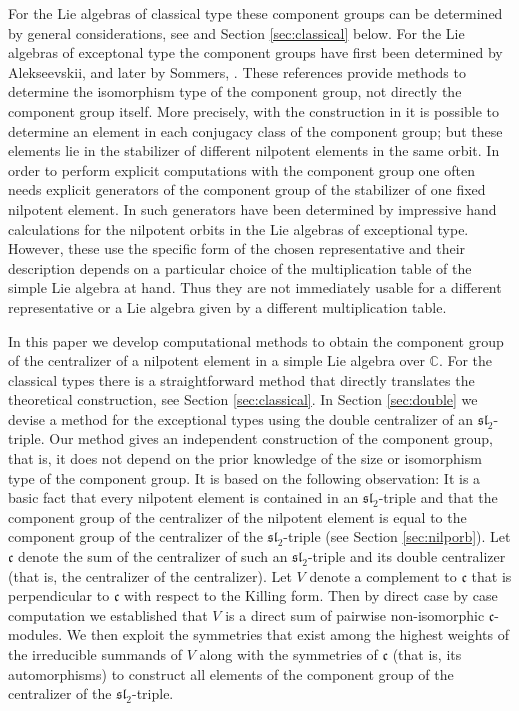 \documentclass[a4paper,10pt]{amsart}
\newcommand{\C}{\mathbb{C}}
\newcommand{\mf}{\mathfrak}
\newcommand{\ssl}{\mf{sl}}
\renewcommand{\c}{\mf{c}}
\numberwithin{equation}{section}
\theoremstyle{remark}
\theoremstyle{remark}
\begin{document}
For the Lie algebras of classical
type these component groups can be determined by general considerations,
see \cite[\S 3]{jannilp} and Section \ref{sec:classical} below.
For the Lie algebras of exceptonal type the component groups have first been
determined by Alekseevskii, \cite{alekseevski} and later by Sommers,
\cite{sommers}. These references provide methods to determine the
isomorphism type of the component group, not directly the component group
itself. More precisely, with
the construction in \cite{sommers} it is possible to determine
an element in each conjugacy class of the component group; but these elements
lie in the stabilizer of different nilpotent elements in the same orbit.
In order to perform explicit computations with the component group one
often needs explicit generators of the component group of the stabilizer of
one fixed nilpotent element. In \cite{lawtest} such generators have been
determined by impressive hand calculations for the nilpotent orbits in the
Lie algebras of exceptional type. However, these use the specific form
of the chosen representative and their description depends on a particular
choice of the multiplication table of the simple Lie algebra at hand. Thus
they are not immediately usable for a different representative
or a Lie algebra given by a different multiplication table.

In this paper we develop computational methods to obtain the component group
of the centralizer of a nilpotent element in a simple Lie algebra
over $\C$. For the classical types there is a straightforward method that
directly translates the theoretical construction, see Section
\ref{sec:classical}. In Section \ref{sec:double} we devise a method for the
exceptional types using the double centralizer of an $\ssl_2$-triple. 
Our method gives an independent construction of the component
group, that is, it does not depend on the prior knowledge of the size
or isomorphism type of the component group. It is based on the following
observation: It is a basic fact that every nilpotent element is contained
in an $\ssl_2$-triple and that the component group of the centralizer of the
nilpotent element is equal to the component group of the centralizer of the
$\ssl_2$-triple (see Section \ref{sec:nilporb}). Let $\c$ denote the sum of
the centralizer of such an $\ssl_2$-triple and its double centralizer (that is,
the centralizer of the centralizer). Let $V$ denote a complement to $\c$
that is perpendicular to $\c$ with respect to the Killing form. Then by
direct case by case computation we established that $V$ is a direct sum
of pairwise non-isomorphic $\c$-modules. We then exploit the symmetries that
exist among the highest weights of the irreducible summands of $V$ along with
the symmetries of $\c$ (that is, its automorphisms) to construct all elements
of the component group of the centralizer of the $\ssl_2$-triple. 
\end{document}
